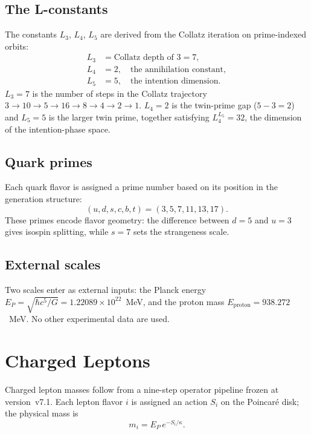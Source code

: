 \documentclass[aps,prd,reprint,twocolumn,showpacs,superscriptaddress]{revtex4-2}
\begin{document}
\subsection{The L-constants}

The constants $L_3$, $L_4$, $L_5$ are derived from the Collatz
iteration on prime-indexed orbits:
\begin{align}
L_3 &= \text{Collatz depth of 3} = 7, \\
L_4 &= 2,\quad \text{the annihilation constant},\\
L_5 &= 5,\quad \text{the intention dimension}.
\end{align}
$L_3 = 7$ is the number of steps in the Collatz trajectory $3 \to 10 \to
5 \to 16 \to 8 \to 4 \to 2 \to 1$.  $L_4 = 2$ is the twin-prime gap
($5 - 3 = 2$) and $L_5 = 5$ is the larger twin prime, together satisfying
$L_4^{L_5} = 32$, the dimension of the intention-phase space.

\subsection{Quark primes}

Each quark flavor is assigned a prime number based on its position in the
generation structure:
\begin{equation}
(u,d,s,c,b,t) = (3,5,7,11,13,17).
\end{equation}
These primes encode flavor geometry: the difference between
$d = 5$ and $u = 3$ gives isospin splitting, while $s = 7$ sets the
strangeness scale.

\subsection{External scales}

Two scales enter as external inputs: the Planck energy
$E_P = \sqrt{\hbar c^5 / G} = 1.22089 \times 10^{22}$~MeV, and the
proton mass $E_{\text{proton}} = 938.272$~MeV.  No other experimental
data are used.

\section{Charged Leptons}
\label{sec:leptons}

Charged lepton masses follow from a nine-step operator pipeline frozen
at version~v7.1.  Each lepton flavor $i$ is assigned an action
$S_i$ on the Poincar\'{e} disk; the physical mass is
\begin{equation}
m_i = E_P \, e^{-S_i / \kappa}.
\label{eq:mass_from_action}
\end{equation}
\end{document}
